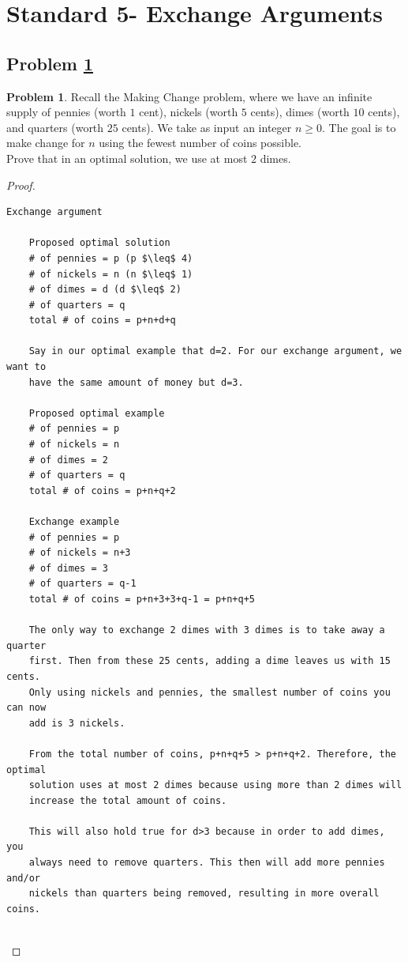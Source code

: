 \documentclass[11pt]{article}
\theoremstyle{definition}
\theoremstyle{definition}
\newtheorem{required}{Problem}
\theoremstyle{definition}
\begin{document}
\newpage
\section{Standard 5- Exchange Arguments}
\subsection{Problem \ref{Exchange1}}
\begin{required} \label{Exchange1}
Recall the Making Change problem, where we have an infinite supply of pennies (worth $1$ cent), nickels (worth $5$ cents), dimes (worth $10$ cents), and quarters (worth $25$ cents). We take as input an integer $n \geq 0$. The goal is to make change for $n$ using the fewest number of coins possible. \\

\noindent Prove that in an optimal solution, we use at most $2$ dimes. 
\end{required}

\begin{proof}
\begin{lstlisting}
Exchange argument

    Proposed optimal solution
    # of pennies = p (p $\leq$ 4) 
    # of nickels = n (n $\leq$ 1)
    # of dimes = d (d $\leq$ 2) 
    # of quarters = q
    total # of coins = p+n+d+q
    
    Say in our optimal example that d=2. For our exchange argument, we want to
    have the same amount of money but d=3. 

    Proposed optimal example
    # of pennies = p
    # of nickels = n
    # of dimes = 2
    # of quarters = q
    total # of coins = p+n+q+2
    
    Exchange example
    # of pennies = p
    # of nickels = n+3  
    # of dimes = 3
    # of quarters = q-1
    total # of coins = p+n+3+3+q-1 = p+n+q+5
    
    The only way to exchange 2 dimes with 3 dimes is to take away a quarter
    first. Then from these 25 cents, adding a dime leaves us with 15 cents.
    Only using nickels and pennies, the smallest number of coins you can now
    add is 3 nickels. 
    
    From the total number of coins, p+n+q+5 > p+n+q+2. Therefore, the optimal
    solution uses at most 2 dimes because using more than 2 dimes will 
    increase the total amount of coins. 
    
    This will also hold true for d>3 because in order to add dimes, you
    always need to remove quarters. This then will add more pennies and/or 
    nickels than quarters being removed, resulting in more overall coins. 
    
\end{lstlisting}




\end{proof}
\end{document}
